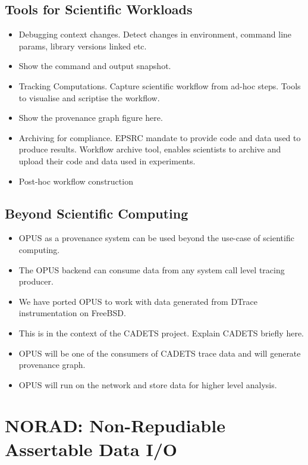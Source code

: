 \documentclass[withindex,glossary]{cam-thesis}
\begin{document}
\section{Tools for Scientific Workloads}
\begin{itemize}
\item Debugging context changes. Detect changes in environment, command line params, library versions linked etc.
\item Show the command and output snapshot.
\item Tracking Computations. Capture scientific workflow from ad-hoc steps. Tools to visualise and scriptise the workflow.
\item Show the provenance graph figure here.
\item Archiving for compliance. EPSRC mandate to provide code and data used to produce results. Workflow archive tool, enables scientists to archive and upload their code and data used in experiments.
\item Post-hoc workflow construction
\end{itemize}


\section{Beyond Scientific Computing}
\begin{itemize}
\item OPUS as a provenance system can be used beyond the use-case of scientific computing.
\item The OPUS backend can consume data from any system call level tracing producer.
\item We have ported OPUS to work with data generated from DTrace instrumentation on FreeBSD.
\item This is in the context of the CADETS project. Explain CADETS briefly here.
\item OPUS will be one of the consumers of CADETS trace data and will generate provenance graph.
\item OPUS will run on the network and store data for higher level analysis.
\end{itemize}


\chapter{NORAD: Non-Repudiable Assertable Data I/O}
\end{document}
